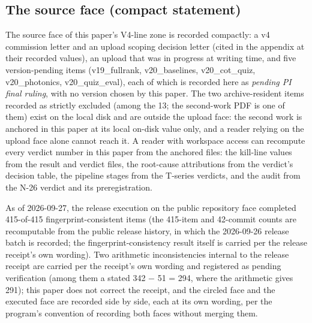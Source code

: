 \documentclass[11pt]{article}
\begin{document}
\subsection{The source face (compact statement)}
\noindent The source face of this paper's V4-line zone is recorded compactly: a v4 commission letter and an upload scoping decision letter (cited in the appendix at their recorded values), an upload that was in progress at writing time, and five version-pending items (v19\_fullrank, v20\_baselines, v20\_cot\_quiz, v20\_photonics, v20\_quiz\_eval), each of which is recorded here as \emph{pending PI final ruling}, with no version chosen by this paper. The two archive-resident items recorded as strictly excluded (among the 13; the second-work PDF is one of them) exist on the local disk and are outside the upload face: the second work is anchored in this paper at its local on-disk value only, and a reader relying on the upload face alone cannot reach it. A reader with workspace access can recompute every verdict number in this paper from the anchored files: the kill-line values from the result and verdict files, the root-cause attributions from the verdict's decision table, the pipeline stages from the T-series verdicts, and the audit from the N-26 verdict and its preregistration.\par
\noindent As of 2026-09-27, the release execution on the public repository face completed 415-of-415 fingerprint-consistent items (the 415-item and 42-commit counts are recomputable from the public release history, in which the 2026-09-26 release batch is recorded; the fingerprint-consistency result itself is carried per the release receipt's own wording). Two arithmetic inconsistencies internal to the release receipt are carried per the receipt's own wording and registered as pending verification (among them a stated 342 − 51 = 294, where the arithmetic gives 291); this paper does not correct the receipt, and the circled face and the executed face are recorded side by side, each at its own wording, per the program's convention of recording both faces without merging them.\par
\end{document}
